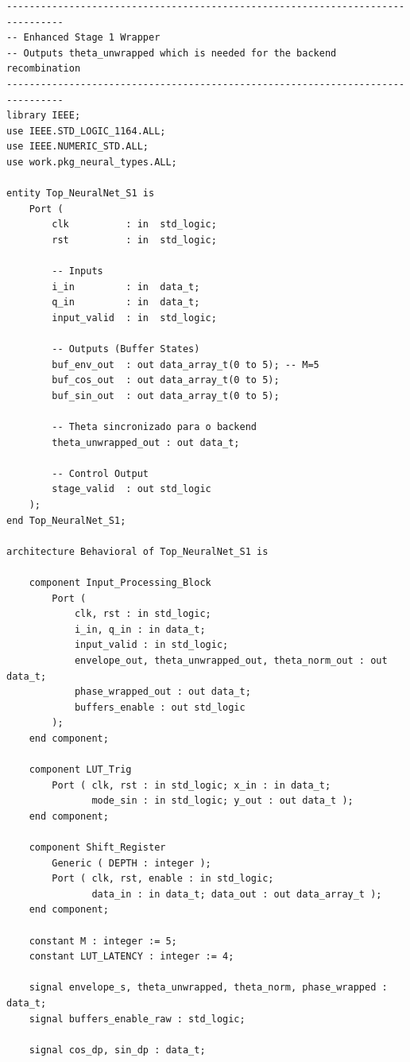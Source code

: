 \documentclass[a4paper,12pt]{article}
\begin{document}
\begin{lstlisting}[style=vhdlstyle,
    caption={C\'odigo VHDL completo do \texttt{Top\_NeuralNet\_S1}.},
    label={lst:top_s1}]
--------------------------------------------------------------------------------
-- Enhanced Stage 1 Wrapper
-- Outputs theta_unwrapped which is needed for the backend recombination
--------------------------------------------------------------------------------
library IEEE;
use IEEE.STD_LOGIC_1164.ALL;
use IEEE.NUMERIC_STD.ALL;
use work.pkg_neural_types.ALL;

entity Top_NeuralNet_S1 is
    Port (
        clk          : in  std_logic;
        rst          : in  std_logic;

        -- Inputs
        i_in         : in  data_t;
        q_in         : in  data_t;
        input_valid  : in  std_logic;

        -- Outputs (Buffer States)
        buf_env_out  : out data_array_t(0 to 5); -- M=5
        buf_cos_out  : out data_array_t(0 to 5);
        buf_sin_out  : out data_array_t(0 to 5);

        -- Theta sincronizado para o backend
        theta_unwrapped_out : out data_t;

        -- Control Output
        stage_valid  : out std_logic
    );
end Top_NeuralNet_S1;

architecture Behavioral of Top_NeuralNet_S1 is

    component Input_Processing_Block
        Port (
            clk, rst : in std_logic;
            i_in, q_in : in data_t;
            input_valid : in std_logic;
            envelope_out, theta_unwrapped_out, theta_norm_out : out data_t;
            phase_wrapped_out : out data_t;
            buffers_enable : out std_logic
        );
    end component;

    component LUT_Trig
        Port ( clk, rst : in std_logic; x_in : in data_t;
               mode_sin : in std_logic; y_out : out data_t );
    end component;

    component Shift_Register
        Generic ( DEPTH : integer );
        Port ( clk, rst, enable : in std_logic;
               data_in : in data_t; data_out : out data_array_t );
    end component;

    constant M : integer := 5;
    constant LUT_LATENCY : integer := 4;

    signal envelope_s, theta_unwrapped, theta_norm, phase_wrapped : data_t;
    signal buffers_enable_raw : std_logic;

    signal cos_dp, sin_dp : data_t;


\end{lstlisting}
\end{document}
